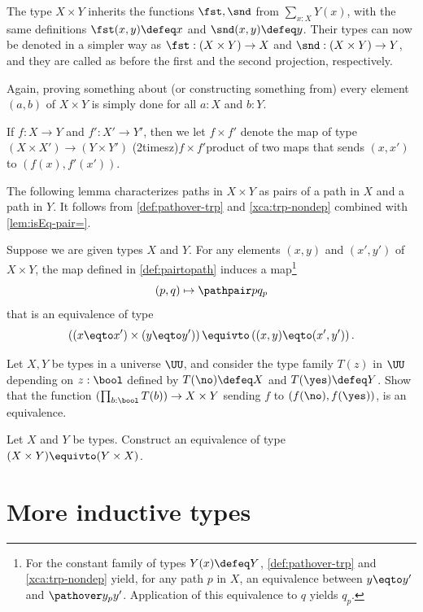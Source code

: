 The type $X \times Y$ inherits the functions $\fst,\snd$ from
$\sum_{x:X} Y(x)$, with the same definitions $\fst(x,y)\defeq x$
and $\snd(x,y)\defeq y$. Their types can now be denoted in a
simpler way as $\fst: (X \times Y)\to X$ and
$\snd: (X \times Y)\to Y$, and they are called as before the
first and the second projection, respectively.

Again, proving something about (or constructing something from) every
element $(a,b)$ of $X \times Y$ is simply done for all $a:X$ and $b:Y$.

If $f: X \to Y$ and $f': X' \to Y'$, then we let
$f\times f'$ denote the map of type $(X\times X') \to (Y\times Y')$
\glossary(2timesz){$f\times f'$}{product of two maps}
that sends $(x,x')$ to $(f(x),f'(x'))$.

The following lemma characterizes paths in $X\times Y$ as pairs of a path in $X$ 
and a path in $Y$. It follows from \cref{def:pathover-trp} and 
\cref{xca:trp-nondep} combined with \cref{lem:isEq-pair=}.

\begin{lemma}\label{lem:isEq-pair-bin=}
  Suppose we are given types $X$ and $Y$.
  For any elements $(x,y)$ and $(x',y')$ of $X \times Y$,
  the map defined in \cref{def:pairtopath} induces a map\footnote{%
For the constant family of types $Y(x)\defeq Y$,
\cref{def:pathover-trp} and \cref{xca:trp-nondep} yield, for any path $p$ in $X$,
an equivalence between $y\eqto y'$ and $\pathover y _ p {y'}$.
Application of this equivalence to $q$ yields $q_p$.
}
  \[
    (p,q) \mapsto \pathpair p {q_p}
  \]
  that is an equivalence of type
  \[
    \left((x\eqto x') \times (y\eqto y')\right) \equivto \left((x,y)\eqto (x',y')\right).
  \]
\end{lemma}

\begin{xca}\label{xca:binary-prod-equiv}
  Let $X,Y$ be types in a universe $\UU$, and consider the type family
  $T(z)$ in $\UU$ depending on $z:\bool$ defined by
  $T(\no)\defeq X$ and $T(\yes) \defeq Y$.
  Show that the function $(\prod_{b:\bool}T(b))\to X\times Y$
  sending $f$ to $(f(\no),f(\yes))$, is an equivalence.
\end{xca}

\begin{xca}\label{xca:binary-prod-comm}
  Let $X$ and $Y$ be types.
  Construct an equivalence of type $(X \times Y) \equivto (Y\times X)$.
\end{xca}

\section{More inductive types}
\label{sec:inductive-types}

